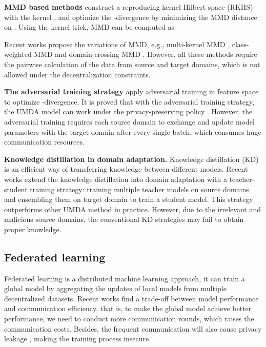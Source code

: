 \documentclass{article}
\begin{document}
\textbf{MMD based methods} \cite{DBLP:journals/corr/TzengHZSD14} construct a reproducing kernel Hilbert space (RKHS)  with the kernel , and optimize the -divergence by minimizing the MMD distance  on . Using the kernel trick, MMD can be computed as 

Recent works propose the variations of MMD, e.g., multi-kernel MMD \citep{DBLP:conf/icml/LongC0J15}, class-weighted MMD\citep{DBLP:conf/cvpr/YanDLWXZ17} and domain-crossing MMD \citep{DBLP:conf/iccv/PengBXHSW19}. However, all these methods require the pairwise calculation of the data from source and target domains, which is not allowed under the decentralization constraints.

\textbf{The adversarial training strategy} \cite{DBLP:conf/cvpr/SaitoWUH18,DBLP:conf/iclr/0002ZWCMG18} apply adversarial training in feature space to optimize -divergence. It is proved that with the adversarial training strategy, the UMDA model can work under the privacy-preserving policy \citep{DBLP:conf/iclr/PengHZS20}. However, the adversarial training requires each source domain to exchange and update model parameters
with the target domain after every single batch, which consumes huge communication resources.

\textbf{Knowledge distillation in domain adaptation.} 
Knowledge distillation (KD) \cite{DBLP:journals/corr/HintonVD15} is an efficient way of transferring knowledge between different models. Recent works \cite{DBLP:conf/icassp/MengLGJ18,DBLP:journals/corr/abs-2003-07325} extend the knowledge distillation into domain adaptation with a teacher-student training strategy: training multiple teacher models on source domains and ensembling them on target domain to train a student model. This strategy outperforms other UMDA method in practice. However, due to the
irrelevant and malicious source domains, the conventional
KD strategies may fail to obtain proper knowledge.
\subsection{Federated learning}
Federated learning \citep{DBLP:journals/corr/KonecnyMYRSB16} is a distributed machine learning approach, it can train a global model by aggregating the updates of local models from multiple decentralized datasets. Recent works \cite{DBLP:conf/aistats/McMahanMRHA17} find a trade-off between model performance and communication efficiency, that is, to make the global model achieve better performance, we need to conduct more communication rounds, which raises the communication costs. Besides, the frequent communication will also cause privacy leakage \cite{DBLP:conf/infocom/WangSZSWQ19}, making the training process insecure.
\end{document}
